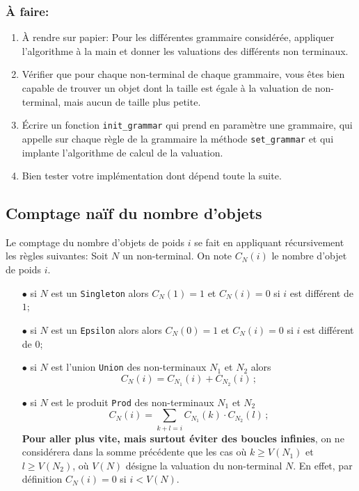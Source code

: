 \documentclass[11pt]{article}
\renewcommand{\emph}[1]{\textbf{#1}}
\newcounter{asuivre}
\newenvironment{asks}{\begin{enumerate}\setcounter{enumi}{\theasuivre}}%
                       {\setcounter{asuivre}{\theenumi}\end{enumerate}}
\begin{document}
\subsubsection{À faire:}

\begin{asks}
\item À rendre sur papier: Pour les différentes grammaire considérée, appliquer
  l'algorithme à la main et donner les valuations des différents non
  terminaux.
\item Vérifier que pour chaque non-terminal de chaque grammaire, vous êtes
  bien capable de trouver un objet dont la taille est égale à la valuation de
  non-terminal, mais aucun de taille plus petite.
\item Écrire un fonction \texttt{init\_grammar} qui prend en paramètre une
  grammaire, qui appelle sur chaque règle de la grammaire la méthode
  \verb+set_grammar+ et qui implante l'algorithme de calcul de la valuation.
\item Bien tester votre implémentation dont dépend toute la suite.
\end{asks}

\subsection{Comptage naïf du nombre d'objets}

Le comptage du nombre d'objets de poids $i$ se fait en appliquant
récursivement les règles suivantes:
Soit $N$ un non-terminal. On note $C_N(i)$ le nombre d'objet de poids $i$.
\begin{itemize}
\item[$\bullet$] si $N$ est un \texttt{Singleton} alors $C_N(1) = 1$ et $C_N(i)
  = 0$ si $i$ est différent de $1$;
\item[$\bullet$] si $N$ est un \texttt{Epsilon} alors alors $C_N(0) = 1$ et
  $C_N(i) = 0$ si $i$ est différent de $0$;
\item[$\bullet$] si $N$ est l'union \texttt{Union} des non-terminaux $N_1$ et
  $N_2$ alors
  $$C_N(i) = C_{N_1}(i) + C_{N_2}(i)\,;$$
\item[$\bullet$] si $N$ est le produit \texttt{Prod} des non-terminaux $N_1$ et
  $N_2$
  $$C_N(i) = \sum_{k+l=i} C_{N_1}(k) \cdot C_{N_2}(l)\,;$$
  \emph{Pour aller plus vite, mais surtout éviter des boucles infinies}, on ne
  considérera dans la somme précédente que les cas où $k \geq V(N_1)$ et
  $l \geq V(N_2)$, où $V(N)$ désigne la valuation du non-terminal $N$. En
  effet, par définition $C_N(i) = 0$ si $i < V(N)$.
\end{itemize}
\end{document}
